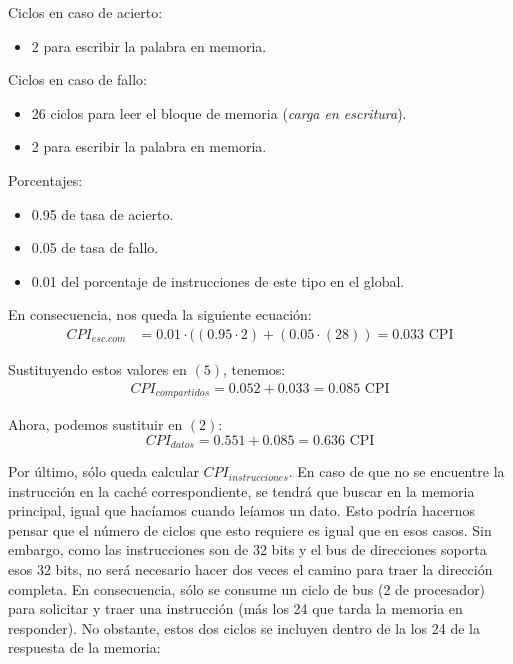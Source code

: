 \documentclass[12pt,a4paper]{article}
\begin{document}
\pagebreak

Ciclos en caso de acierto:
\begin{itemize}
\item 2 para escribir la palabra en memoria.
\end{itemize}

Ciclos en caso de fallo:
\begin{itemize}
\item 26 ciclos para leer el bloque de memoria (\textit{carga en escritura}).
\item 2 para escribir la palabra en memoria.
\end{itemize}

Porcentajes:
\begin{itemize}
\item 0.95 de tasa de acierto.
\item 0.05 de tasa de fallo.
\item 0.01 del porcentaje de instrucciones de este tipo en el global.
\end{itemize}

En consecuencia, nos queda la siguiente ecuación:
\begin{align*}
CPI_{esc.com}&=0.01\cdot ((0.95\cdot 2)+(0.05\cdot (28))=0.033\text{ CPI}
\end{align*}

Sustituyendo estos valores en $(5)$, tenemos:
\begin{align*}
CPI_{compartidos}=0.052+0.033=0.085 \text{ CPI}
\end{align*}

Ahora, podemos sustituir en $(2)$:
\begin{equation*}
CPI_{datos}=0.551+0.085=0.636\text{ CPI}
\end{equation*}

Por último, sólo queda calcular $CPI_{instrucciones}$. En caso de que no se encuentre la instrucción en la caché correspondiente, se tendrá que buscar en la memoria principal, igual que hacíamos cuando leíamos un dato. Esto podría hacernos pensar que el número de ciclos que esto requiere es igual que en esos casos. Sin embargo, como las instrucciones son de 32 bits y el bus de direcciones soporta esos 32 bits, no será necesario hacer dos veces el camino para traer la dirección completa. En consecuencia, sólo se consume un ciclo de bus (2 de procesador) para solicitar y traer una instrucción (más los 24 que tarda la memoria en responder). No obstante, estos dos ciclos se incluyen dentro de la los 24 de la respuesta de la memoria:\\
\end{document}
